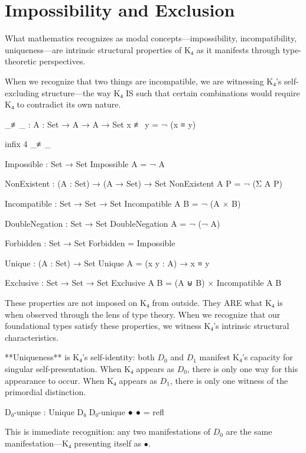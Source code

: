 \documentclass[11pt,a4paper]{book}
\begin{document}
\section{Impossibility and Exclusion}

What mathematics recognizes as modal concepts—impossibility, incompatibility, uniqueness—are intrinsic structural properties of K₄ as it manifests through type-theoretic perspectives.

When we recognize that two things are incompatible, we are witnessing K₄'s self-excluding structure—the way K₄ IS such that certain combinations would require K₄ to contradict its own nature.

\begin{code}
_≢_ : {A : Set} → A → A → Set
x ≢ y = ¬ (x ≡ y)

infix 4 _≢_

Impossible : Set → Set
Impossible A = ¬ A

NonExistent : (A : Set) → (A → Set) → Set
NonExistent A P = ¬ (Σ A P)

Incompatible : Set → Set → Set
Incompatible A B = ¬ (A × B)

DoubleNegation : Set → Set
DoubleNegation A = ¬ (¬ A)
\end{code}

\begin{code}
Forbidden : Set → Set
Forbidden = Impossible

Unique : (A : Set) → Set
Unique A = (x y : A) → x ≡ y

Exclusive : Set → Set → Set
Exclusive A B = (A ⊎ B) × Incompatible A B
\end{code}

These properties are not imposed on K₄ from outside. They ARE what K₄ is when observed through the lens of type theory. When we recognize that our foundational types satisfy these properties, we witness K₄'s intrinsic structural characteristics.

**Uniqueness** is K₄'s self-identity: both $D_0$ and $D_1$ manifest K₄'s capacity for singular self-presentation. When K₄ appears as $D_0$, there is only one way for this appearance to occur. When K₄ appears as $D_1$, there is only one witness of the primordial distinction.

\begin{code}
D₀-unique : Unique D₀
D₀-unique ● ● = refl
\end{code}

This is immediate recognition: any two manifestations of $D_0$ are the same manifestation—K₄ presenting itself as $\bullet$.
\end{document}
